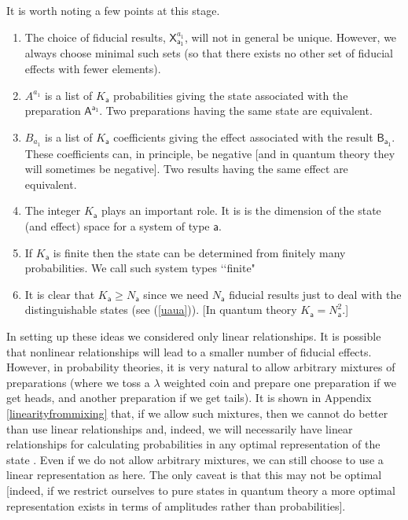 \documentclass[10pt]{article}
\begin{document}
It is worth noting a few points at this stage.
\begin{enumerate}
\item The choice of fiducial results, $\mathsf{X}_\mathsf{{a_1}}^{a_1}$, will not in general be unique.  However, we always choose minimal such sets (so that there exists no other set of fiducial effects with fewer elements).
\item $A^{a_1}$ is a list of $K_\mathsf{a}$  probabilities giving the state associated with the preparation $\mathsf{A^{a_1}}$. Two preparations having the same state are equivalent.
\item $B_{a_1}$ is a list of $K_\mathsf{a}$ coefficients giving the effect  associated with the result $\mathsf{B_{a_1}}$.  These coefficients can, in principle, be negative [and in quantum theory they will sometimes be negative].  Two results having the same effect are equivalent.
\item The integer $K_\mathsf{a}$ plays an important role.  It is is the dimension of the state (and effect) space for a system of type $\mathsf a$.
\item If $K_\mathsf{a}$ is finite  then the state can be determined from finitely many probabilities. We call such system types \lq\lq finite"
\item It is clear that $K_\mathsf{a}\geq N_\mathsf{a}$ since we need $N_\mathsf{a}$ fiducial results just to deal with the distinguishable states (see (\ref{uaua})). [In quantum theory $K_\mathsf{a}=N_\mathsf{a}^2$.]
\end{enumerate}
In setting up these ideas we considered only linear relationships.  It is possible that nonlinear relationships will lead to a smaller number of fiducial effects.  However, in probability theories, it is very natural to allow arbitrary mixtures of preparations (where we toss a $\lambda$ weighted coin and prepare one preparation if we get heads, and another preparation if we get tails).  It is shown in Appendix \ref{linearityfrommixing} that, if we allow such mixtures, then we cannot do better than use linear relationships and, indeed, we will necessarily have linear relationships for calculating probabilities in any optimal representation of the state \cite{hardy2009foliable}.  Even if we do not allow arbitrary mixtures, we can still choose to use a linear representation as here.  The only caveat is that this may not be optimal [indeed, if we restrict ourselves to pure states in quantum theory a more optimal representation exists in terms of amplitudes rather than probabilities].
\end{document}
